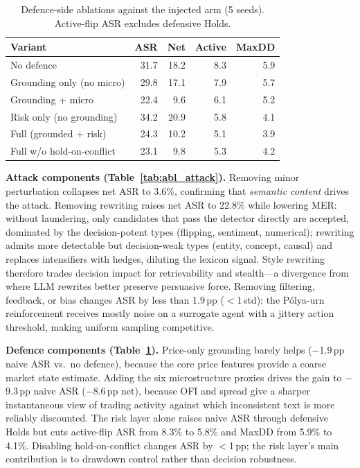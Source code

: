\documentclass[conference]{IEEEtran}
\begin{document}
\begin{table}[t]
\centering
\caption{Defence-side ablations against the injected arm (5 seeds).
Active-flip ASR excludes defensive Holds.}
\label{tab:abl_defense}
\setlength{\tabcolsep}{4pt}
\begin{tabular}{@{}lrrrr@{}}
\toprule
\textbf{Variant} & \textbf{ASR} & \textbf{Net} & \textbf{Active} & \textbf{MaxDD} \\
\midrule
No defence                & 31.7 & 18.2 & 8.3 & 5.9 \\
Grounding only (no micro) & 29.8 & 17.1 & 7.9 & 5.7 \\
Grounding + micro         & 22.4 &  9.6 & 6.1 & 5.2 \\
Risk only (no grounding)  & 34.2 & 20.9 & 5.8 & 4.1 \\
Full (grounded + risk)    & 24.3 & 10.2 & 5.1 & 3.9 \\
Full w/o hold-on-conflict & 23.1 &  9.8 & 5.3 & 4.2 \\
\bottomrule
\end{tabular}
\end{table}

\textbf{Attack components (Table~\ref{tab:abl_attack}).}
Removing minor perturbation collapses net ASR to 3.6\%, confirming that
\emph{semantic content} drives the attack.
Removing rewriting raises net ASR to 22.8\% while lowering MER:
without laundering, only candidates that pass the detector directly are
accepted, dominated by the decision-potent types (flipping, sentiment,
numerical); rewriting admits more detectable but decision-weak types
(entity, concept, causal) and replaces intensifiers with hedges, diluting
the lexicon signal.
Style rewriting therefore trades decision impact for retrievability and
stealth---a divergence from \cite{liu2026autoredtrader} where LLM rewrites
better preserve persuasive force.
Removing filtering, feedback, or bias changes ASR by less than 1.9\,pp
($<$1\,std): the P\'olya-urn reinforcement receives mostly noise on a
surrogate agent with a jittery action threshold, making uniform sampling
competitive.

\textbf{Defence components (Table~\ref{tab:abl_defense}).}
Price-only grounding barely helps ($-$1.9\,pp naive ASR vs.\ no defence),
because the core price features provide a coarse market state estimate.
Adding the six microstructure proxies drives the gain to $-$9.3\,pp naive
ASR ($-$8.6\,pp net), because OFI and spread give a sharper instantaneous
view of trading activity against which inconsistent text is more reliably
discounted.
The risk layer alone raises naive ASR through defensive Holds but cuts
active-flip ASR from 8.3\% to 5.8\% and MaxDD from 5.9\% to 4.1\%.
Disabling hold-on-conflict changes ASR by $<$1\,pp; the risk layer's main
contribution is to drawdown control rather than decision robustness.
\end{document}
